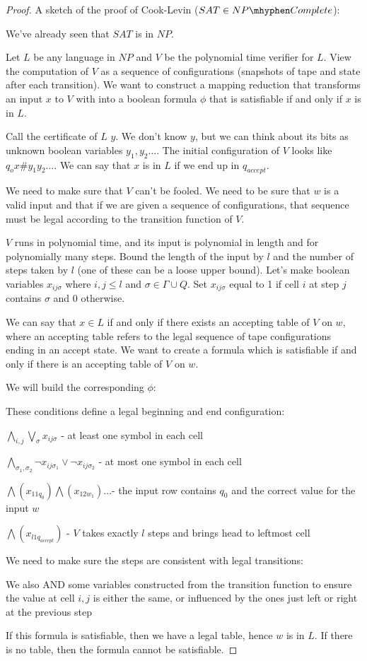 \begin{proof}
	A sketch of the proof of Cook-Levin ($SAT\in NP\mhyphen Complete$):
	
	We've already seen that $SAT$ is in $NP$.
	
	Let $L$ be any language in $NP$ and $V$ be the polynomial time verifier for $L$.  View the computation of $V$ as a sequence of configurations (snapshots of tape and state after each transition).  We want to construct a mapping reduction that transforms an input $x$ to $V$ with into a boolean formula $\phi$ that is satisfiable if and only if $x$ is in $L$.  
	
	Call the certificate of $L$ $y$.  We don't know $y$, but we can think about its bits as unknown boolean variables $y_1,y_2\dots$.  The initial configuration of $V$ looks like $q_o x \# y_1y_2\dots$.  We can say that $x$ is in $L$ if we end up in $q_{accept}$.  
	
	We need to make sure that $V$ can't be fooled.  We need to be sure that $w$ is a valid input and that if we are given a sequence of configurations, that sequence must be legal according to the transition function of $V$.
	
	$V$ runs in polynomial time, and its input is polynomial in length and for polynomially many steps.  Bound the length of the input by $l$ and the number of steps taken by $l$ (one of these can be a loose upper bound).  Let's make boolean variables $x_{ij\sigma}$ where $i,j \leq l$ and $\sigma \in \Gamma\cup Q$.  Set $x_{ij\sigma}$ equal to 1 if cell $i$ at step $j$ contains $\sigma$ and 0 otherwise.
	
	We can say that $x\in L$ if and only if there exists an accepting table of $V$ on $w$, where an accepting table refers to the legal sequence of tape configurations ending in an accept state.  We want to create a formula which is satisfiable if and only if there is an accepting table of $V$ on $w$.
	
	We will build the corresponding $\phi$:
	
	These conditions define a legal beginning and end configuration:
	
	$\bigwedge\limits_{i,j} \bigvee\limits_\sigma x_{ij\sigma}$ - at least one symbol in each cell
	
	$\bigwedge\limits_{\sigma_1 , \sigma_2} \lnot x_{ij\sigma_1} \lor \lnot x_{ij\sigma_2}$ - at most one symbol in each cell
	
	$\bigwedge (x_{11q_0})\bigwedge(x_{12w_1})\dots$- the input row contains $q_0$ and the correct value for the input $w$
	
	$ \bigwedge (x_{l1q_{accept}})$ - $V$ takes exactly $l$ steps and brings head to leftmost cell
	
	We need to make sure the steps are consistent with legal transitions:
	
We also AND some variables constructed from the transition function to ensure the value at cell $i,j$ is either the same, or influenced by the ones just left or right at the previous step


If this formula is satisfiable, then we have a legal table, hence $w$ is in $L$.  If there is no table, then the formula cannot be satisfiable.
\end{proof}





